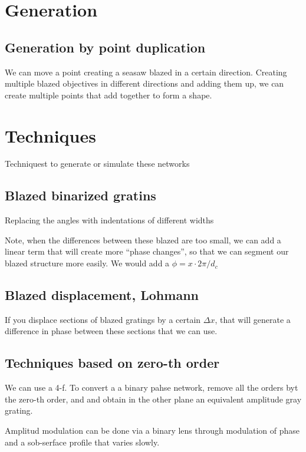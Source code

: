 \documentclass[../main/main.tex]{subfiles}
\begin{document}
 \section{Generation}

 \subsection{Generation by point duplication}

 We can move a point creating a seasaw blazed in a certain direction.
 Creating multiple blazed objectives in different directions and adding them up, we can create multiple points that add together to form a shape.



 \section{Techniques}

 Techniquest to generate or simulate these networks

 \subsection{Blazed binarized gratins}

 Replacing the angles with indentations of different widths

 Note, when the differences between these blazed are too small, we can add a linear term that will create more ``phase changes'', so that we can segment our blazed structure more easily. We would add a $\phi =x \cdot 2 \pi  / d_{c}$

 \subsection{Blazed displacement, Lohmann}

 If you displace sections of blazed gratings by a certain $\Delta x$, that will generate a difference in phase between these sections that we can use.

\subsection{Techniques based on zero-th order}

We can use a 4-f. To convert a a binary pahse network, remove all the orders byt the zero-th order, and and obtain in the other plane an equivalent amplitude gray grating.


Amplitud modulation can be done via  a binary lens through modulation of phase and a sob-serface profile that varies slowly.
\end{document}
